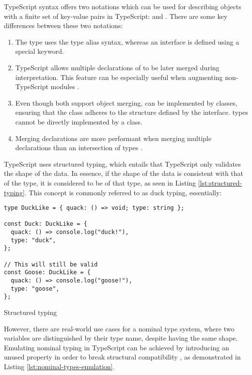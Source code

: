 TypeScript syntax offers two notations which can be used for describing objects with a finite set of key-value pairs in TypeScript:  and . There are some key differences between these two notations:

\begin{enumerate}
  \item The  type uses the type alias syntax, whereas an interface is defined using a special  keyword.
  \item TypeScript allows multiple declarations of  to be later merged during interpretation. This feature can be especially useful when augmenting non-TypeScript modules \cite{DocumentationDeclarationMerging}.
  \item Even though both support object merging,  can be implemented by classes, ensuring that the class adheres to the structure defined by the interface.  types cannot be directly implemented by a class.
  \item Merging  declarations are more performant when merging multiple declarations than an intersection of  types \cite{Performance}.
\end{enumerate}

TypeScript uses structured typing, which entails that TypeScript only validates the shape of the data. In essence, if the shape of the data is consistent with that of the type, it is considered to be of that type, as seen in Listing \ref{lst:structured-typing}. This concept is commonly referred to as duck typing, essentially: 

\begin{listing}[ht]
  \begin{verbatim}
type DuckLike = { quack: () => void; type: string };

const Duck: DuckLike = {
  quack: () => console.log("duck!"),
  type: "duck",
};

// This will still be valid
const Goose: DuckLike = {
  quack: () => console.log("goose!"),
  type: "goose",
};
\end{verbatim}
  \caption{Structured typing}\label{lst:structured-typing}
\end{listing}

However, there are real-world use cases for a nominal type system, where two variables are distinguished by their type name, despite having the same shape. Emulating nominal typing in TypeScript can be achieved by introducing an unused property in order to break structural compatibility \cite{NominalTyping}, as demonstrated in Listing \ref{lst:nominal-types-emulation}.

